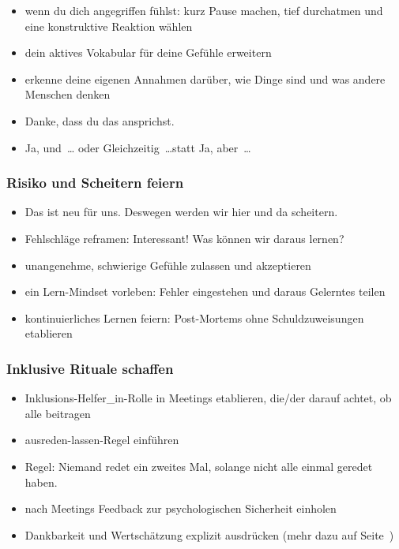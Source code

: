 \begin{itemize}
    \item wenn du dich angegriffen fühlst: kurz Pause machen, tief durchatmen und eine konstruktive Reaktion wählen
    \item dein aktives Vokabular für deine Gefühle erweitern
    \item erkenne deine eigenen Annahmen darüber, wie Dinge sind und was andere Menschen denken 
    \item \glqq Danke, dass du das ansprichst.\grqq {}
    \item \glqq Ja, und~\ldots\grqq{} oder \glqq Gleichzeitig~\ldots\grqq statt \glqq Ja, aber~\ldots\grqq {}
\end{itemize}

\subsubsection{Risiko und Scheitern feiern}

\begin{itemize}
    \item \glqq Das ist neu für uns. Deswegen werden wir hier und da scheitern.\grqq
    \item Fehlschläge reframen: \glqq Interessant! Was können wir daraus lernen?\grqq {} 
    \item unangenehme, schwierige Gefühle zulassen und akzeptieren 
    \item ein Lern-Mindset vorleben: Fehler eingestehen und daraus Gelerntes teilen 
    \item kontinuierliches Lernen feiern: Post-Mortems ohne Schuldzuweisungen etablieren  
\end{itemize}

\subsubsection{Inklusive Rituale schaffen}

\begin{itemize}
    \item \glqq Inklusions-Helfer\_in\grqq-Rolle in Meetings etablieren, die/der darauf achtet, ob alle beitragen 
    \item \glqq ausreden-lassen\grqq-Regel einführen 
    \item Regel: \glqq Niemand redet ein zweites Mal, solange nicht alle einmal geredet haben.\grqq
    \item nach Meetings Feedback zur psychologischen Sicherheit einholen
    \item Dankbarkeit und Wertschätzung explizit ausdrücken (mehr dazu auf Seite~\pageref{wertschaetzung})  
\end{itemize}


